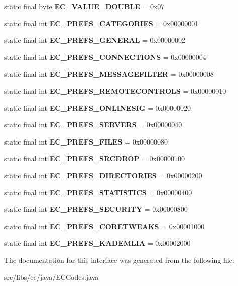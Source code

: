 \begin{DoxyCompactItemize}
\item 
static final byte {\bfseries EC\_\-VALUE\_\-DOUBLE} = 0x07\label{interfaceECCodes_add248d1d886ff923b8e1d53d235e290a}

\item 
static final int {\bfseries EC\_\-PREFS\_\-CATEGORIES} = 0x00000001\label{interfaceECCodes_a97002bfdd22511989b4e2f93598ee379}

\item 
static final int {\bfseries EC\_\-PREFS\_\-GENERAL} = 0x00000002\label{interfaceECCodes_a1c1485f91aaa8a335bfc310bfe2e2818}

\item 
static final int {\bfseries EC\_\-PREFS\_\-CONNECTIONS} = 0x00000004\label{interfaceECCodes_a1b04954f2e0a999d9738c5c96083d134}

\item 
static final int {\bfseries EC\_\-PREFS\_\-MESSAGEFILTER} = 0x00000008\label{interfaceECCodes_a91a0415351379cc48fc5609d3de59102}

\item 
static final int {\bfseries EC\_\-PREFS\_\-REMOTECONTROLS} = 0x00000010\label{interfaceECCodes_af40aa3879d508eef26cb6517eba27416}

\item 
static final int {\bfseries EC\_\-PREFS\_\-ONLINESIG} = 0x00000020\label{interfaceECCodes_a5f099320806a47dd5ee52881a27b7e35}

\item 
static final int {\bfseries EC\_\-PREFS\_\-SERVERS} = 0x00000040\label{interfaceECCodes_aa206d4051978ef4f9e7e3d3b9d3d05d5}

\item 
static final int {\bfseries EC\_\-PREFS\_\-FILES} = 0x00000080\label{interfaceECCodes_a31089ed8edb4ef9bc5f475fcaa2522ac}

\item 
static final int {\bfseries EC\_\-PREFS\_\-SRCDROP} = 0x00000100\label{interfaceECCodes_a2f1f67e840ac54c093cdc171e7d31a08}

\item 
static final int {\bfseries EC\_\-PREFS\_\-DIRECTORIES} = 0x00000200\label{interfaceECCodes_a25a56364f1ebe34c488f75ad81813e01}

\item 
static final int {\bfseries EC\_\-PREFS\_\-STATISTICS} = 0x00000400\label{interfaceECCodes_a0788e297afa5552bf66ffa6730e9d8a9}

\item 
static final int {\bfseries EC\_\-PREFS\_\-SECURITY} = 0x00000800\label{interfaceECCodes_ab5b11c7963a14ef2e7d3b6f751ed186e}

\item 
static final int {\bfseries EC\_\-PREFS\_\-CORETWEAKS} = 0x00001000\label{interfaceECCodes_a9837d81edd41a92eb0b2c57f6a49f967}

\item 
static final int {\bfseries EC\_\-PREFS\_\-KADEMLIA} = 0x00002000\label{interfaceECCodes_a1413e8b2f735c84c825a85c2a563c53b}

\end{DoxyCompactItemize}


The documentation for this interface was generated from the following file:\begin{DoxyCompactItemize}
\item 
src/libs/ec/java/ECCodes.java\end{DoxyCompactItemize}

